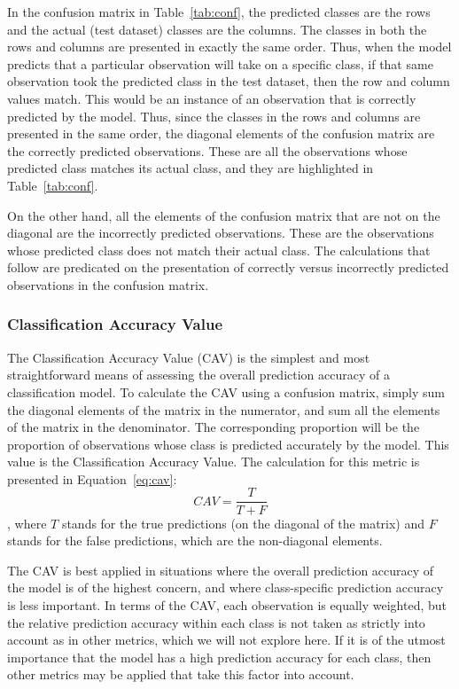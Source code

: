 \documentclass[12pt]{article}
\begin{document}
In the confusion matrix in Table~\ref{tab:conf}, the predicted classes are the rows and the 
actual (test dataset) classes are the columns.  The classes in both the rows and columns are 
presented in exactly the same order.  Thus, when the model predicts that a particular 
observation will take on a specific class, if that same observation took the predicted class 
in the test dataset, then the row and column values match.  This would be an instance of an 
observation that is correctly predicted by the model.  Thus, since the classes in the rows 
and columns are presented in the same order, the diagonal elements of the confusion matrix 
are the correctly predicted observations.  These are all the observations whose predicted 
class matches its actual class, and they are highlighted in Table~\ref{tab:conf}.  

On the other hand, all the elements of the confusion matrix that are not on the diagonal are 
the incorrectly predicted observations.  These are the observations whose predicted class 
does not match their actual class.  The calculations that follow are predicated on the 
presentation of correctly versus incorrectly predicted observations in the confusion matrix.  

\subsubsection{Classification Accuracy Value}
\label{sec:CAV}

The Classification Accuracy Value (CAV) is the simplest and most straightforward means of 
assessing the overall prediction accuracy of a classification model.  To calculate the CAV 
using a confusion matrix, simply sum the diagonal elements of the matrix in the numerator, 
and sum all the elements of the matrix in the denominator.  The corresponding proportion 
will be the proportion of observations whose class is predicted accurately by the model.  
This value is the Classification Accuracy Value.  The calculation for this metric is 
presented in Equation~\eqref{eq:cav}:
\begin{equation}
    \label{eq:cav}
    CAV = \frac {T} {T + F}
\end{equation}
, where $T$ stands for the true predictions (on the diagonal of the matrix) and $F$ stands 
for the false predictions, which are the non-diagonal elements.  

The CAV is best applied in situations where the overall prediction accuracy of the model 
is of the highest concern, and where class-specific prediction accuracy is less important.  
In terms of the CAV, each observation is equally weighted, but the relative prediction 
accuracy within each class is not taken as strictly into account as in other metrics, which 
we will not explore here.  If it is of the utmost importance that the model has a high 
prediction accuracy for each class, then other metrics may be applied that take this factor 
into account. 
\end{document}
